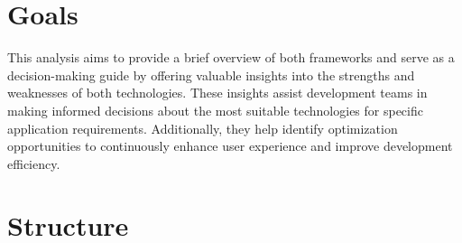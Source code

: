 \section{Goals}
This analysis aims to provide a brief overview of both frameworks and serve as a decision-making guide by offering valuable insights into the strengths and weaknesses of both technologies. 
These insights assist development teams in making informed decisions about the most suitable technologies for specific application requirements. Additionally, they help identify optimization opportunities to continuously enhance user experience and improve development efficiency.

\section{Structure}
